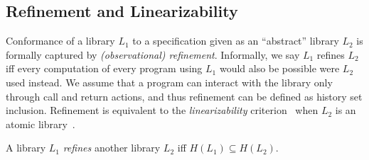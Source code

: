 \subsection{Refinement and Linearizability}
\vspace{-1.5mm}
Conformance of a library $L_1$ to a specification given as an ``abstract'' library $L_2$ 
is formally captured by \emph{(observational) refinement}. Informally, 
we
say $L_1$ refines $L_2$ if{f} every computation of every program
using $L_1$ would also be possible were $L_2$ used instead. We assume that a program can 
interact with the library only through call and return actions, and thus refinement can be defined
as history set inclusion. Refinement is equivalent to the \emph{linearizability} criterion~\cite{journals/toplas/HerlihyW90} 
when $L_2$ is an atomic library~\cite{journals/tcs/FilipovicORY10,DBLP:conf/popl/BouajjaniEEH15}.
 
\vspace{-1.5mm}
\begin{definition}\label{def:lib_ref}
A library $L_1$ \emph{refines} another library $L_2$ if{f} $H(L_1) \subseteq H(L_2)$.
\vspace{-1.5mm}
\end{definition}


